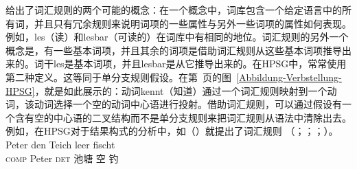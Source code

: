  \citet{Jackendoff75a}给出了词汇规则的两个可能的概念：在一个概念中，词库包含一个给定语言中的所有词，并且只有冗余规则来说明词项的一些属性与另外一些词项的属性如何表现。例如，les（读）和lesbar（可读的）在词库中有相同的地位。词汇规则的另外一个概念是，有一些基本词项，并且其余的词项是借助词汇规则从这些基本词项推导出来的。词干les是基本词项，并且lesbar是从它推导出来的。在HPSG中，常常使用第二种定义。这等同于单分支规则假设。在第~\pageref{Abbildung-Verbstellung-HPSG}页的图~\ref{Abbildung-Verbstellung-HPSG}，就是如此展示的：动词kennt（知道）通过一个词汇规则映射到一个动词，该动词选择一个空的动词中心语进行投射。借助词汇规则，可以通过假设有一个含有空的中心语的二叉结构而不是单分支规则来把词汇规则从语法中清除出去。例如，在HPSG对于结果构式的分析中，如（）就提出了词汇规则 （\citealp{Verspoor97a}；\citealp{Wechsler97a}；\citealp{WN2001a}；\citealp[\S~5]{Mueller2002b}）。
\ea
\gll [dass] Peter den Teich leer fischt\\
	 \spacebr{}\textsc{comp} Peter \textsc{det} 池塘 空 钓\\
